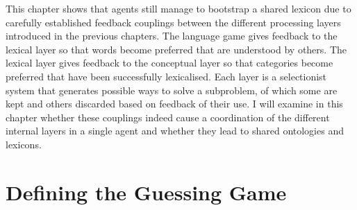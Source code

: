This chapter shows that agents still manage to 
bootstrap a shared lexicon due to carefully established
feedback couplings between the different processing
layers introduced in the previous chapters. 
The language game gives feedback to the lexical layer so 
that words become preferred that are understood by others.
The lexical layer gives feedback to the conceptual layer
so that categories become preferred that have been
successfully lexicalised. Each layer is a selectionist system
that generates possible ways to solve a subproblem, of which some 
are kept and others discarded based on feedback of their use.
I will examine in this chapter whether these
couplings indeed cause a coordination of the different internal
layers in a single agent and whether they lead to shared 
ontologies and lexicons. 

\section{Defining the Guessing Game}

